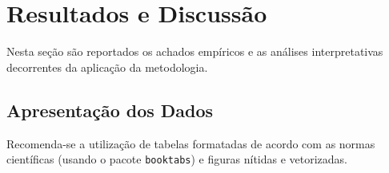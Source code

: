 \section{Resultados e Discussão}
\label{sec:resultados}

Nesta seção são reportados os achados empíricos e as análises interpretativas decorrentes da aplicação da metodologia.

\subsection{Apresentação dos Dados}
Recomenda-se a utilização de tabelas formatadas de acordo com as normas científicas (usando o pacote \texttt{booktabs}) e figuras nítidas e vetorizadas.
